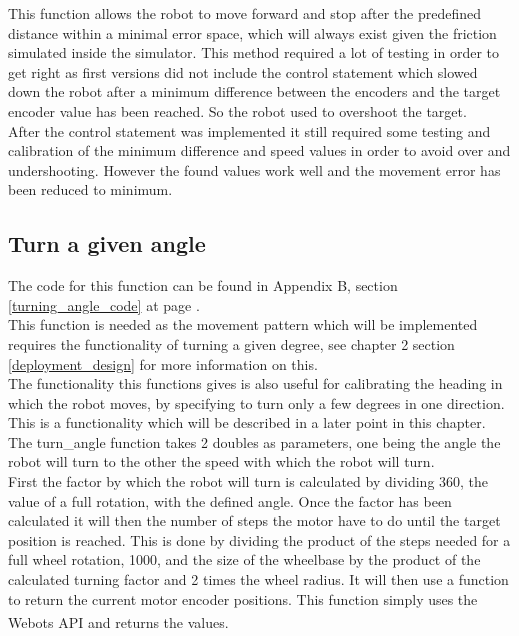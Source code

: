This function allows the robot to move forward and stop after the predefined distance within a minimal error space, which will always exist given the friction simulated inside the simulator. This method required a lot of testing in order to get right as first versions did not include the control statement which slowed down the robot after a minimum difference between the encoders and the target encoder value has been reached. So the robot used to overshoot the target. \\
After the control statement was implemented it still required some testing and calibration of the minimum difference and speed values in order to avoid over and undershooting. However the found values work well and the movement error has been reduced to minimum.\\

\subsection{Turn a given angle}
\label{turn_angle_description}
The code for this function can be found in Appendix B, section \ref{turning_angle_code} at page \pageref{turning_angle_code}.\\
This function is needed as the movement pattern which will be implemented requires the functionality of turning a given degree, see chapter 2 section \ref{deployment_design} for more information on this. \\
The functionality this functions gives is also useful for calibrating the heading in which the robot moves, by specifying to turn only a few degrees in one direction. This is a functionality which will be described in a later point in this chapter.
The turn\_angle function takes 2 doubles as parameters, one being the angle the robot will turn to the other the speed with which the robot will turn.\\
First the factor by which the robot will turn is calculated by dividing 360, the value of a full rotation, with the defined angle.
Once the factor has been calculated it will then the number of steps the motor have to do until the target position is reached. This is done by dividing the product of the steps needed for a full wheel rotation, 1000, and the size of the wheelbase by the product of the calculated turning factor and 2 times the wheel radius. It will then use a function to return the current motor encoder positions. This function simply uses the Webots\textsuperscript{\texttrademark}  API and returns the values. \\[3ex]


